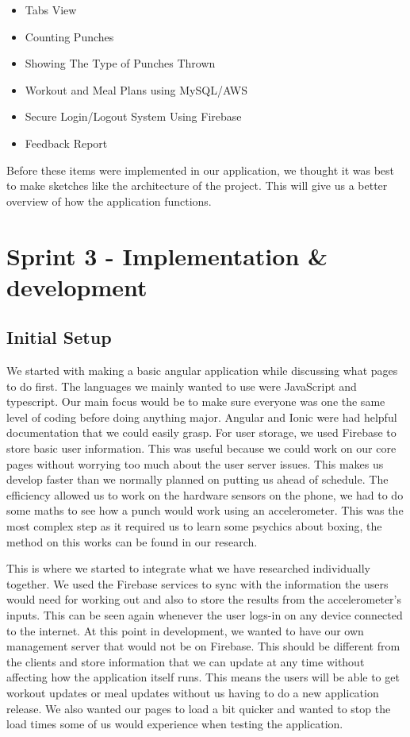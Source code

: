 \documentclass[a4paper,12pt]{report}
\begin{document}
\begin{itemize}
  \item Tabs View
  \item Counting Punches
  \item Showing The Type of Punches Thrown
  \item Workout and Meal Plans using MySQL/AWS
  \item Secure Login/Logout System Using Firebase
  \item Feedback Report
  \newline
\end{itemize}

Before these items were implemented in our application, we thought it was best to make sketches like the architecture of the project. This will give us a better overview of how the application functions.

\section{Sprint 3 - Implementation \& development}
\subsection{Initial Setup}
We started with making a basic angular application while discussing what pages to do first. The languages we mainly wanted to use were JavaScript and typescript. Our main focus would be to make sure everyone was one the same level of coding before doing anything major. Angular and Ionic were had helpful documentation that we could easily grasp. For user storage, we used Firebase to store basic user information. This was useful because we could work on our core pages without worrying too much about the user server issues. This makes us develop faster than we normally planned on putting us ahead of schedule. The efficiency allowed us to work on the hardware sensors on the phone, we had to do some maths to see how a punch would work using an accelerometer. This was the most complex step as it required us to learn some psychics about boxing, the method on this works can be found in our research. 

This is where we started to integrate what we have researched individually together. We used the Firebase services to sync with the information the users would need for working out and also to store the results from the accelerometer's inputs. This can be seen again whenever the user logs-in on any device connected to the internet. At this point in development, we wanted to have our own management server that would not be on Firebase. This should be different from the clients and store information that we can update at any time without affecting how the application itself runs. This means the users will be able to get workout updates or meal updates without us having to do a new application release. We also wanted our pages to load a bit quicker and wanted to stop the load times some of us would experience when testing the application.
\end{document}
